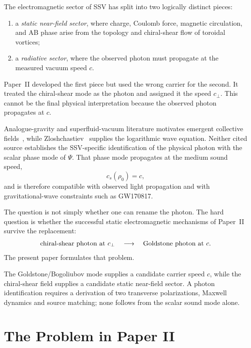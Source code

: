 \documentclass[11pt,a4paper]{article}
\begin{document}
The electromagnetic sector of SSV has split into two logically distinct
pieces:
\begin{enumerate}[label=(\roman*),leftmargin=2em]
    \item a \emph{static near-field sector}, where charge, Coulomb force,
          magnetic circulation, and AB phase arise from the
          topology and chiral-shear flow of toroidal vortices;
    \item a \emph{radiative sector}, where the observed photon must
          propagate at the measured vacuum speed $c$.
\end{enumerate}
Paper~II developed the first piece but used the wrong carrier for the
second.  It treated the chiral-shear mode as the photon and assigned it the
speed $c_\perp$.  This cannot be the final physical interpretation because
the observed photon propagates at $c$.

Analogue-gravity and superfluid-vacuum literature motivates emergent
collective fields~\cite{volovik2003}, while
Zloshchastiev~\cite{zloshchastiev2020} supplies the logarithmic wave
equation.  Neither cited source establishes the SSV-specific identification
of the physical photon with the scalar phase mode of $\Psi$.  That phase mode
propagates at
the medium sound speed,
\begin{equation}
    c_s(\rho_0)=c,
    \label{eq:cs_c}
\end{equation}
and is therefore compatible with observed light propagation and with
gravitational-wave constraints such as GW170817.

The question is not simply whether one can rename the photon.  The hard
question is whether the successful static electromagnetic mechanisms of
Paper~II survive the replacement:
\[
    \hbox{chiral-shear photon at }c_\perp
    \quad\longrightarrow\quad
    \hbox{Goldstone photon at }c .
\]
The present paper formulates that problem.

\begin{resultbox}
The Goldstone/Bogoliubov mode supplies a candidate carrier speed $c$, while
the chiral-shear field supplies a candidate static near-field sector.  A
photon identification requires a derivation of two transverse polarizations,
Maxwell dynamics and source matching; none follows from the scalar sound mode
alone.
\end{resultbox}

\section{The Problem in Paper II}
\label{sec:problem}
\end{document}
